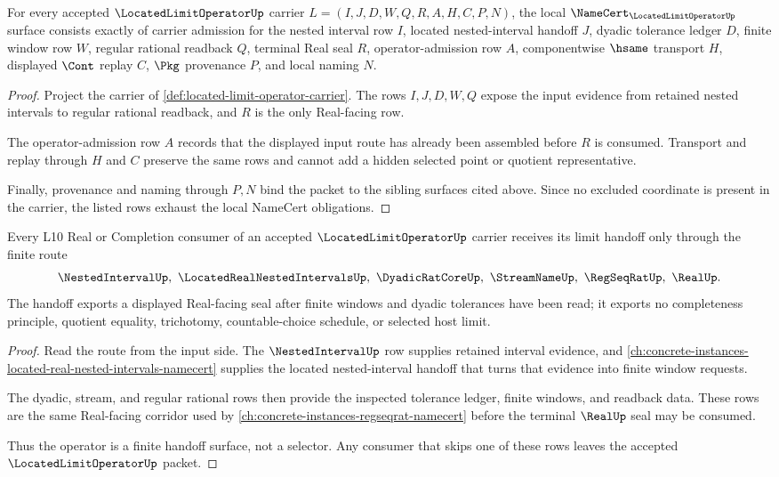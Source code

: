 \begin{theorem}
\label{thm:located-limit-operator-namecert-obligations}
For every accepted $\LocatedLimitOperatorUp$ carrier $L=(I,J,D,W,Q,R,A,H,C,P,N)$, the local $\NameCert_{\LocatedLimitOperatorUp}$ surface consists exactly of carrier admission for the nested interval row $I$, located nested-interval handoff $J$, dyadic tolerance ledger $D$, finite window row $W$, regular rational readback $Q$, terminal Real seal $R$, operator-admission row $A$, componentwise $\hsame$ transport $H$, displayed $\Cont$ replay $C$, $\Pkg$ provenance $P$, and local naming $N$.
\end{theorem}
\begin{proof}
Project the carrier of \autoref{def:located-limit-operator-carrier}. The rows $I,J,D,W,Q$ expose the input evidence from retained nested intervals to regular rational readback, and $R$ is the only Real-facing row.

The operator-admission row $A$ records that the displayed input route has already been assembled before $R$ is consumed. Transport and replay through $H$ and $C$ preserve the same rows and cannot add a hidden selected point or quotient representative.

Finally, provenance and naming through $P,N$ bind the packet to the sibling surfaces cited above. Since no excluded coordinate is present in the carrier, the listed rows exhaust the local NameCert obligations.
\end{proof}

\begin{theorem}
\label{thm:located-limit-operator-l10-handoff}
Every L10 Real or Completion consumer of an accepted $\LocatedLimitOperatorUp$ carrier receives its limit handoff only through the finite route
$$
\NestedIntervalUp,\ \LocatedRealNestedIntervalsUp,\ \DyadicRatCoreUp,\ \StreamNameUp,\ \RegSeqRatUp,\ \RealUp .
$$
The handoff exports a displayed Real-facing seal after finite windows and dyadic tolerances have been read; it exports no completeness principle, quotient equality, trichotomy, countable-choice schedule, or selected host limit.
\end{theorem}
\begin{proof}
Read the route from the input side. The $\NestedIntervalUp$ row supplies retained interval evidence, and \autoref{ch:concrete-instances-located-real-nested-intervals-namecert} supplies the located nested-interval handoff that turns that evidence into finite window requests.

The dyadic, stream, and regular rational rows then provide the inspected tolerance ledger, finite windows, and readback data. These rows are the same Real-facing corridor used by \autoref{ch:concrete-instances-regseqrat-namecert} before the terminal $\RealUp$ seal may be consumed.

Thus the operator is a finite handoff surface, not a selector. Any consumer that skips one of these rows leaves the accepted $\LocatedLimitOperatorUp$ packet.
\end{proof}

